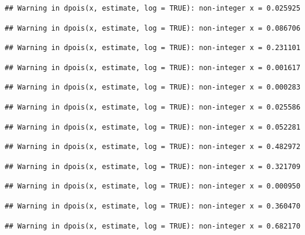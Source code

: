 \documentclass[]{article}
\begin{document}
\begin{verbatim}
## Warning in dpois(x, estimate, log = TRUE): non-integer x = 0.025925
\end{verbatim}

\begin{verbatim}
## Warning in dpois(x, estimate, log = TRUE): non-integer x = 0.086706
\end{verbatim}

\begin{verbatim}
## Warning in dpois(x, estimate, log = TRUE): non-integer x = 0.231101
\end{verbatim}

\begin{verbatim}
## Warning in dpois(x, estimate, log = TRUE): non-integer x = 0.001617
\end{verbatim}

\begin{verbatim}
## Warning in dpois(x, estimate, log = TRUE): non-integer x = 0.000283
\end{verbatim}

\begin{verbatim}
## Warning in dpois(x, estimate, log = TRUE): non-integer x = 0.025586
\end{verbatim}

\begin{verbatim}
## Warning in dpois(x, estimate, log = TRUE): non-integer x = 0.052281
\end{verbatim}

\begin{verbatim}
## Warning in dpois(x, estimate, log = TRUE): non-integer x = 0.482972
\end{verbatim}

\begin{verbatim}
## Warning in dpois(x, estimate, log = TRUE): non-integer x = 0.321709
\end{verbatim}

\begin{verbatim}
## Warning in dpois(x, estimate, log = TRUE): non-integer x = 0.000950
\end{verbatim}

\begin{verbatim}
## Warning in dpois(x, estimate, log = TRUE): non-integer x = 0.360470
\end{verbatim}

\begin{verbatim}
## Warning in dpois(x, estimate, log = TRUE): non-integer x = 0.682170
\end{verbatim}
\end{document}
